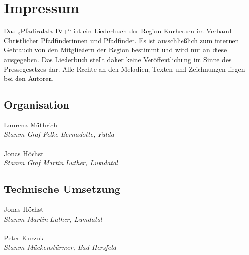 \section*{Impressum}

\vspace{10pt} Das „Pfadiralala IV+“ ist ein Liederbuch der Region Kurhessen im Verband Christlicher Pfadfinderinnen und Pfadfinder. Es ist ausschließlich zum internen Gebrauch von den Mitgliedern der Region bestimmt und wird nur an diese ausgegeben. Das Liederbuch stellt daher keine Veröffentlichung im Sinne des Pressegesetzes dar. Alle Rechte an den Melodien, Texten und Zeichnungen liegen bei den Autoren. \\ \vspace{10pt} 

\begin{centering}
\begin{multicols}{2}

\subsection*{Organisation}
Laurenz Mäthrich \\ \textit{Stamm Graf Folke Bernadotte, Fulda} \\ ~\\
Jonas Höchst \\ \textit{Stamm Graf Martin Luther, Lumdatal}

\subsection*{Technische Umsetzung}
Jonas Höchst \\ \textit{Stamm Martin Luther, Lumdatal} \\ ~\\
Peter Kurzok \\ \textit{Stamm Mückenstürmer, Bad Hersfeld}


\end{multicols}
\end{centering}
